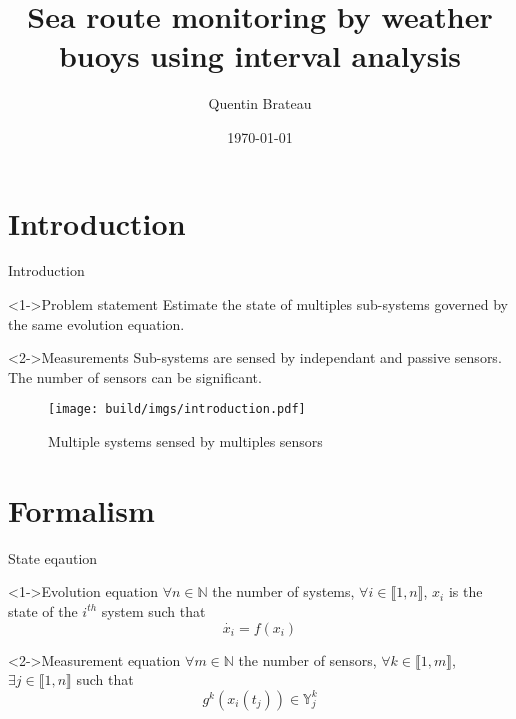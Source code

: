 \documentclass{beamer}
\title{Sea route monitoring by weather buoys using interval analysis}
\date{\today}
\author{Quentin Brateau}
\institute{ENSTA Bretagne}
\begin{document}
    \maketitle

    \section{Introduction}

        \begin{frame}{Introduction}
            \begin{minipage}{0.55\textwidth}
                \begin{block}<1->{Problem statement}
                    Estimate the state of multiples sub-systems governed by the same evolution equation.
                \end{block}
                \begin{block}<2->{Measurements}
                    Sub-systems are sensed by \alert{independant} and \alert{passive} sensors. The number of sensors can be significant.
                \end{block}
            \end{minipage}
            \hfill
            \begin{minipage}{0.4\textwidth}
                \begin{figure}
                    \texttt{[image: build/imgs/introduction.pdf]}
                    \caption{Multiple systems sensed by multiples sensors}
                \end{figure}
            \end{minipage}
        \end{frame}

    \section{Formalism}

        \begin{frame}{State eqaution}
            \begin{block}<1->{Evolution equation}
                $\forall n \in \mathbb{N}$ the number of systems, $\forall i \in \llbracket 1, n\rrbracket$, $x_i$ is the state of the $i^{th}$ system such that
                \begin{equation}
                    \dot{x_i} = f(x_i)
                \end{equation}
            \end{block}

            \begin{block}<2->{Measurement equation}
                $\forall m \in \mathbb{N}$ the number of sensors, $\forall k \in \llbracket 1, m\rrbracket$, $\exists j \in \llbracket 1, n\rrbracket$ such that
                \begin{equation}
                    g^k(x_i(t_j)) \in \mathbb{Y}_j^k
                \end{equation}
            \end{block}
        \end{frame}
\end{document}

